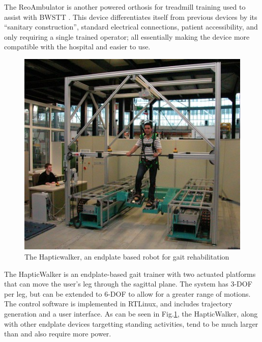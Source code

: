 \documentclass[12pt]{report}
\begin{document}
	The ReoAmbulator is another powered orthosis for treadmill training used to assist with BWSTT \cite{West2002}. This device differentiates itself from previous devices by its ``sanitary construction'', standard electrical connections, patient accessibility, and only requiring a single trained operator; all essentially making the device more compatible with the hospital and easier to use. 
	
	
	
	\begin{figure}[h] 
		\centering
		\includegraphics[width=0.7\linewidth]{Hapticwalker}
		\caption{The Hapticwalker, an endplate based robot for gait rehabilitation}
		\label{fig:Hapticwalker}
	\end{figure}
	
	The HapticWalker \cite{Schmidt2005} is an endplate-based gait trainer with two actuated platforms that can move the user's leg through the sagittal plane. The system has 3-DOF per leg, but can be extended to 6-DOF to allow for a greater range of motions. The control software is implemented in RTLinux, and includes trajectory generation and a user interface. As can be seen in Fig.\ref{fig:Hapticwalker}, the HapticWalker, along with other endplate devices targetting standing activities, tend to be much larger than and also require more power.
	
\end{document}
